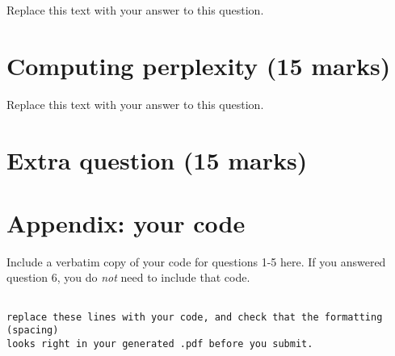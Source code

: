 \documentclass[12pt]{article}
\begin{document}
Replace this text with your answer to this question.


\pagebreak
\section{Computing perplexity (15 marks)}

Replace this text with your answer to this question.


\pagebreak
\section{Extra question (15 marks)}


\pagebreak
\section*{Appendix: your code}

Include a verbatim copy of your code for questions 1-5 here. If you answered question 6, you do {\em not} need to include that code.

\begin{verbatim}

replace these lines with your code, and check that the formatting (spacing)
looks right in your generated .pdf before you submit.

\end{verbatim}
\end{document}
